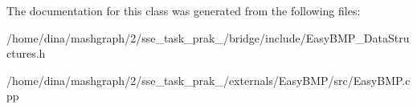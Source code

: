 The documentation for this class was generated from the following files\-:\begin{DoxyCompactItemize}
\item 
/home/dina/mashgraph/2/sse\-\_\-task\-\_\-prak\-\_/bridge/include/Easy\-B\-M\-P\-\_\-\-Data\-Structures.\-h\item 
/home/dina/mashgraph/2/sse\-\_\-task\-\_\-prak\-\_/externals/\-Easy\-B\-M\-P/src/Easy\-B\-M\-P.\-cpp\end{DoxyCompactItemize}
